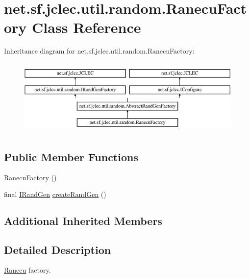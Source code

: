 \hypertarget{classnet_1_1sf_1_1jclec_1_1util_1_1random_1_1_ranecu_factory}{\section{net.\-sf.\-jclec.\-util.\-random.\-Ranecu\-Factory Class Reference}
\label{classnet_1_1sf_1_1jclec_1_1util_1_1random_1_1_ranecu_factory}
}
Inheritance diagram for net.\-sf.\-jclec.\-util.\-random.\-Ranecu\-Factory\-:\begin{figure}[H]
\begin{center}
\leavevmode
\includegraphics[height=3.796610cm]{classnet_1_1sf_1_1jclec_1_1util_1_1random_1_1_ranecu_factory}
\end{center}
\end{figure}
\subsection*{Public Member Functions}
\begin{DoxyCompactItemize}
\item 
\hyperlink{classnet_1_1sf_1_1jclec_1_1util_1_1random_1_1_ranecu_factory_aca9b33d35e21416bd65e997a1a402993}{Ranecu\-Factory} ()
\item 
final \hyperlink{interfacenet_1_1sf_1_1jclec_1_1util_1_1random_1_1_i_rand_gen}{I\-Rand\-Gen} \hyperlink{classnet_1_1sf_1_1jclec_1_1util_1_1random_1_1_ranecu_factory_ae06a5cf7cb1ddd42131a073652020188}{create\-Rand\-Gen} ()
\end{DoxyCompactItemize}
\subsection*{Additional Inherited Members}


\subsection{Detailed Description}
\hyperlink{classnet_1_1sf_1_1jclec_1_1util_1_1random_1_1_ranecu}{Ranecu} factory.

